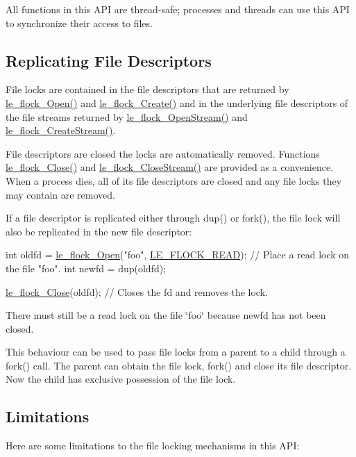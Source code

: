 All functions in this A\+P\+I are thread-\/safe; processes and threads can use this A\+P\+I to synchronize their access to files.\hypertarget{c_flock_c_flock_replicateFd}{}\subsection{Replicating File Descriptors}\label{c_flock_c_flock_replicateFd}
File locks are contained in the file descriptors that are returned by \hyperlink{le__file_lock_8h_aac3e11a6f7f363d29b8dbb1eb6c2c287}{le\+\_\+flock\+\_\+\+Open()} and \hyperlink{le__file_lock_8h_a8fdca3e28190ef85e4457ebf009410b5}{le\+\_\+flock\+\_\+\+Create()} and in the underlying file descriptors of the file streams returned by \hyperlink{le__file_lock_8h_ae9a845ef8afe7cb7c4767573a974e5a0}{le\+\_\+flock\+\_\+\+Open\+Stream()} and \hyperlink{le__file_lock_8h_a6444d5e3d885a7c346cba6993534020b}{le\+\_\+flock\+\_\+\+Create\+Stream()}.

File descriptors are closed the locks are automatically removed. Functions \hyperlink{le__file_lock_8h_a457a07dbf8967757322f531d5beb10b6}{le\+\_\+flock\+\_\+\+Close()} and \hyperlink{le__file_lock_8h_a8cd7aad1d732c6719097daf0359bf32f}{le\+\_\+flock\+\_\+\+Close\+Stream()} are provided as a convenience. When a process dies, all of its file descriptors are closed and any file locks they may contain are removed.

If a file descriptor is replicated either through dup() or fork(), the file lock will also be replicated in the new file descriptor\+:


\begin{DoxyCode}
\textcolor{keywordtype}{int} oldfd = \hyperlink{le__file_lock_8h_aac3e11a6f7f363d29b8dbb1eb6c2c287}{le\_flock\_Open}(\textcolor{stringliteral}{"foo"}, \hyperlink{le__file_lock_8h_a5e5400e33a5e10b7c624748a9ce11280a887421ec0def966e3ffc65e6bde1f1fc}{LE\_FLOCK\_READ});  \textcolor{comment}{// Place a read lock on the
       file "foo".}
\textcolor{keywordtype}{int} newfd = dup(oldfd);

\hyperlink{le__file_lock_8h_a457a07dbf8967757322f531d5beb10b6}{le\_flock\_Close}(oldfd); \textcolor{comment}{// Closes the fd and removes the lock.}
\end{DoxyCode}


There must still be a read lock on the file \char`\"{}foo\char`\"{} because newfd has not been closed.

This behaviour can be used to pass file locks from a parent to a child through a fork() call. The parent can obtain the file lock, fork() and close its file descriptor. Now the child has exclusive possession of the file lock.\hypertarget{c_flock_c_flock_limitations}{}\subsection{Limitations}\label{c_flock_c_flock_limitations}
Here are some limitations to the file locking mechanisms in this A\+P\+I\+:

